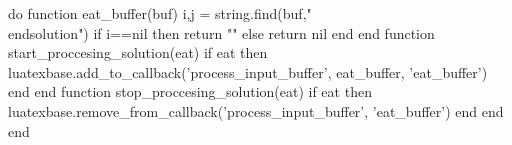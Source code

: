 
\newcommand{\task}[1]{\fbox{\begin{minipage}{4em}\centering\it #1\end{minipage}}}
\newcommand{\makeboxlabel}[1]{\fbox{\begin{minipage}{2em}\centering\it #1\end{minipage}}\hfill}%
\newenvironment{tasklist}
  {\begin{list}
    {\arabic{boxlblcounter}}
    {\usecounter{boxlblcounter}
     \setlength{\labelwidth}{3em}
     \setlength{\labelsep}{0em}
     \setlength{\itemsep}{2pt}
     \setlength{\leftmargin}{1.5cm}
     \setlength{\rightmargin}{2cm}
     \setlength{\itemindent}{0em} 
     \let\makelabel=\makeboxlabel
    }
  }{\end{list}}



\newcommand{\hint}[1]{\ifthenelse{\boolean{ShowHint}}{\noindent\rotatebox[origin=c]{180}{\noindent
\begin{minipage}[t]{\linewidth} \noindent \it Указание: #1 \end{minipage}}}{}}

\makeatletter
\newenvironment{solution*}[1][\text{Решение}]{ 
  \par
  \pushQED{\qed}%
  \normalfont
  \topsep0pt \partopsep3pt
  \trivlist
  \item[\hskip\labelsep
    \itshape
    #1\@addpunct{.}]\ignorespaces
}{
  \ifthenelse{\boolean{ShowSolution}}{
    \popQED\endtrivlist\@endpefalse
    \addvspace{6pt plus 6pt} %
  }{\end{hidden}}
}
\makeatother

\RequirePackage{luacode}
\begin{luacode*}
do 
    function eat_buffer(buf)
        i,j = string.find(buf,"\\end{solution}")
        if i==nil then return "" else return nil end
    end
    function start_proccesing_solution(eat)
        if eat then luatexbase.add_to_callback('process_input_buffer', eat_buffer, 'eat_buffer') end
    end
    function stop_proccesing_solution(eat)
        if eat then luatexbase.remove_from_callback('process_input_buffer', 'eat_buffer') end
    end
end
\end{luacode*}
\ExplSyntaxOn
{}
\ExplSyntaxOff

